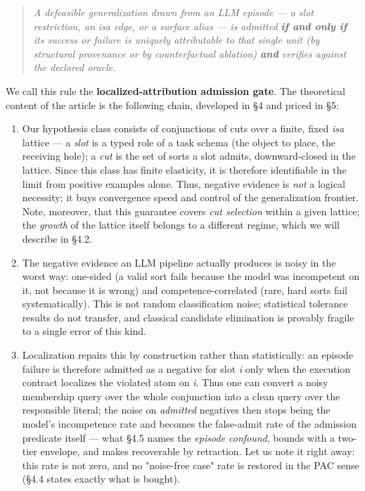 \documentclass[11pt]{article}
\begin{document}
\begin{quote}\itshape A defeasible generalization drawn from an LLM episode — a slot restriction, an \emph{isa} edge, or a surface alias — is admitted \textbf{if and only if} its success or failure is \emph{uniquely attributable} to that single unit (by structural provenance or by counterfactual ablation) \textbf{and} verifies against the declared oracle.\end{quote}

We call this rule the \textbf{localized-attribution admission gate}. The theoretical content of the article is the following chain, developed in §4 and priced in §5:

\begin{enumerate}
\item Our hypothesis class consists of conjunctions of cuts over a finite, fixed \emph{isa} lattice — a \emph{slot} is a typed role of a task schema (the object to place, the receiving hole); a \emph{cut} is the set of sorts a slot admits, downward-closed in the lattice. Since this class has finite elasticity, it is therefore identifiable in the limit from positive examples alone. Thus, negative evidence is \emph{not} a logical necessity; it buys convergence speed and control of the generalization frontier. Note, moreover, that this guarantee covers \emph{cut selection} within a given lattice; the \emph{growth} of the lattice itself belongs to a different regime, which we will describe in §4.2.
\item The negative evidence an LLM pipeline actually produces is noisy in the worst way: one-sided (a valid sort fails because the model was incompetent on it, not because it is wrong) and competence-correlated (rare, hard sorts fail systematically). This is not random classification noise; statistical tolerance results do not transfer, and classical candidate elimination is provably fragile to a single error of this kind.
\item Localization repairs this by construction rather than statistically: an episode failure is therefore admitted as a negative for slot \emph{i} only when the execution contract localizes the violated atom on \emph{i}. Thus one can convert a noisy membership query over the whole conjunction into a clean query over the responsible literal; the noise on \emph{admitted} negatives then stops being the model's incompetence rate and becomes the false-admit rate of the admission predicate itself — what §4.5 names the \emph{episode confound}, bounds with a two-tier envelope, and makes recoverable by retraction. Let us note it right away: this rate is not zero, and no "noise-free case" rate is restored in the PAC sense (§4.4 states exactly what is bought).

\end{enumerate}
\end{document}
